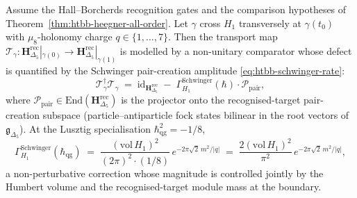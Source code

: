 \begin{theorem}
\label{thm:htbb-schwinger-humbert}
Assume the Hall--Borcherds recognition gates and the comparison
hypotheses of Theorem~\ref{thm:htbb-heegner-all-order}. Let $\gamma$ cross $H_1$
transversely at $\gamma(t_0)$ with $\mu_8$-holonomy charge
$q\in\{1, \ldots, 7\}$. Then the transport map
$\mathcal{T}_\gamma\colon \mathbf{H}_{\Delta_5}^{\mathrm{rec}}|_{\gamma(0)} \to
\mathbf{H}_{\Delta_5}^{\mathrm{rec}}|_{\gamma(1)}$ is modelled by a
non-unitary comparator whose defect is quantified by the Schwinger
pair-creation amplitude
\eqref{eq:htbb-schwinger-rate}:
\begin{equation}\label{eq:htbb-schwinger-defect}
 \mathcal{T}_\gamma^\dagger\mathcal{T}_\gamma \;=\;
 \mathrm{id}_{\mathbf{H}_{\Delta_5}^{\mathrm{rec}}} \;-\;
 \Gamma^{\mathrm{Schwinger}}_{H_1}(\hbar)\cdot
 \mathcal{P}_{\mathrm{pair}},
\end{equation}
where
$\mathcal{P}_{\mathrm{pair}}\in\mathrm{End}(\mathbf{H}_{\Delta_5}^{\mathrm{rec}})$
is the projector onto the recognised-target pair-creation
subspace (particle--antiparticle fock states bilinear in the root
vectors of $\mathfrak{g}_{\Delta_5}$). At the Lusztig specialisation
$\hbar_{\mathrm{qg}}^2 = -1/8$,
\[
 \Gamma^{\mathrm{Schwinger}}_{H_1}(\hbar_{\mathrm{qg}})
 \;=\; \frac{(\mathrm{vol}\,H_1)^2}{(2\pi)^2\cdot(1/8)}\,
 e^{-2\pi\sqrt 2\,m^2/|q|}
 \;=\; \frac{2(\mathrm{vol}\,H_1)^2}{\pi^2}\,
 e^{-2\pi\sqrt 2\,m^2/|q|},
\]
a non-perturbative correction whose magnitude is controlled jointly by
the Humbert volume and the recognised-target module mass at the boundary.
\end{theorem}

